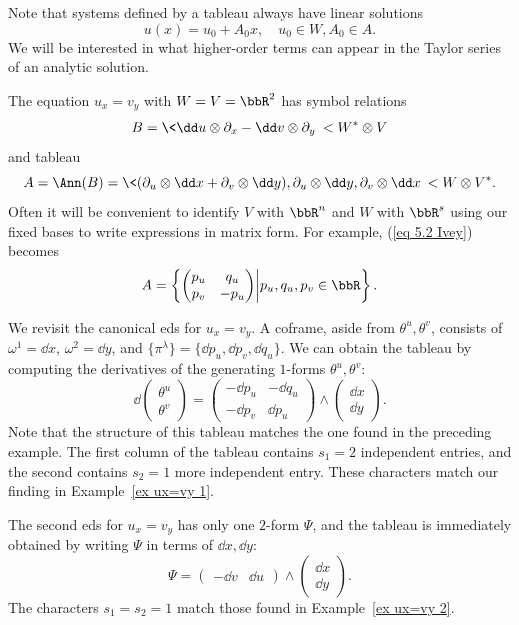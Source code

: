 Note that systems defined by a tableau always have linear solutions 
\[u(x)=u_0+A_0x,\quad u_0\in W,A_0\in A.\] 
We will be interested in what higher-order terms can appear in the Taylor series of an analytic solution.

\begin{example}
    The equation $u_x=v_y$ with $W=V=\bbR^2$ has symbol relations 
    \[B=\<\dd u\otimes \partial_{x}-\dd v\otimes \partial_{y}\>< W^\ast\otimes V\]
    and tableau 
    \[A=\Ann(B)=\<(\partial_{u}\otimes \dd x+\partial_{v}\otimes\dd y),\partial_{u}\otimes \dd y,\partial_{v}\otimes \dd x\>< W\otimes V^\ast.\label{eq 5.2 Ivey}\]
    Often it will be convenient to identify $V$ with $\bbR^n$ and $W$ with $\bbR^s$ using our fixed bases to write expressions in matrix form. For example, (\ref{eq 5.2 Ivey}) becomes 
    \[A=\left\{
    \begin{pmatrix}
        p_u&q_u\\p_v&-p_u
    \end{pmatrix}\middle| p_u,q_u,p_v\in\bbR
\right\}.\]
\end{example}

\begin{example}[\ref{ex ux=vy 1} continued]
    We revisit the canonical \gls{eds} for $u_x=v_y$. A coframe, aside from $\theta^u,\theta^v$, consists of $\omega^1=\dd x$, $\omega^2=\dd y$, and $\{\pi^\lambda\}=\{\dd p_u,\dd p_v,\dd q_u\}$. We can obtain the tableau by computing the derivatives of the generating $1$-forms $\theta^u,\theta^v$:
    \[\dd \begin{pmatrix}
        \theta^u\\\theta^v
    \end{pmatrix}=
    \begin{pmatrix}
        -\dd p_u & -\dd q_u\\
        -\dd p_v & \dd p_u
    \end{pmatrix}\wedge 
    \begin{pmatrix}
        \dd x\\ \dd y
    \end{pmatrix}.
    \]
    Note that the structure of this tableau matches the one found in the preceding example.
    The first column of the tableau contains $s_1=2$ independent entries, and the second contains $s_2=1$ more independent entry. These characters match our finding in Example~\ref{ex ux=vy 1}.
\end{example}

\begin{example}[\ref{ex ux=vy 2} continued]
    The second \gls{eds} for $u_x=v_y$ has only one $2$-form $\Psi$, and the tableau is immediately obtained by writing $\Psi$ in terms of $\dd x,\dd y$:
    \[\Psi=
    \begin{pmatrix}
        -\dd v & \dd u
    \end{pmatrix}\wedge 
    \begin{pmatrix}
        \dd x\\ \dd y
    \end{pmatrix}.
    \]
    The characters $s_1=s_2=1$ match those found in Example~\ref{ex ux=vy 2}.
\end{example}



